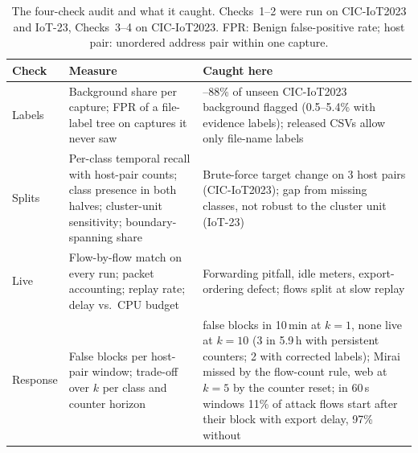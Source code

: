\begin{table}[t]
\centering
\caption{The four-check audit and what it caught. Checks~1--2 were run on CIC-IoT2023 and IoT-23, Checks~3--4 on CIC-IoT2023. FPR: Benign false-positive rate; host pair: unordered address pair within one capture.}
\label{tab:checklist}
\footnotesize
\setlength{\tabcolsep}{3pt}
\begin{tabular}{>{\raggedright\arraybackslash}p{1.55cm}>{\raggedright\arraybackslash}p{3.2cm}>{\raggedright\arraybackslash}p{3.25cm}}
\hline
Check & Measure & Caught here \\
\hline
1 Labels & Background share per capture; FPR of a file-label tree on captures it never saw & 71--88\% of unseen CIC-IoT2023 background flagged (0.5--5.4\% with evidence labels); released CSVs allow only file-name labels \\
2 Splits & Per-class temporal recall with host-pair counts; class presence in both halves; cluster-unit sensitivity; boundary-spanning share & Brute-force target change on 3 host pairs (CIC-IoT2023); gap from missing classes, not robust to the cluster unit (IoT-23) \\
3 Live & Flow-by-flow match on every run; packet accounting; replay rate; delay vs.\ CPU budget & Forwarding pitfall, idle meters, export-ordering defect; flows split at slow replay \\
4 Response & False blocks per host-pair window; trade-off over $k$ per class and counter horizon & 60 false blocks in 10\,min at $k=1$, none live at $k=10$ (3 in 5.9\,h with persistent counters; 2 with corrected labels); Mirai missed by the flow-count rule, web at $k=5$ by the counter reset; in 60\,s windows 11\% of attack flows start after their block with export delay, 97\% without \\
\hline
\end{tabular}
\end{table}
